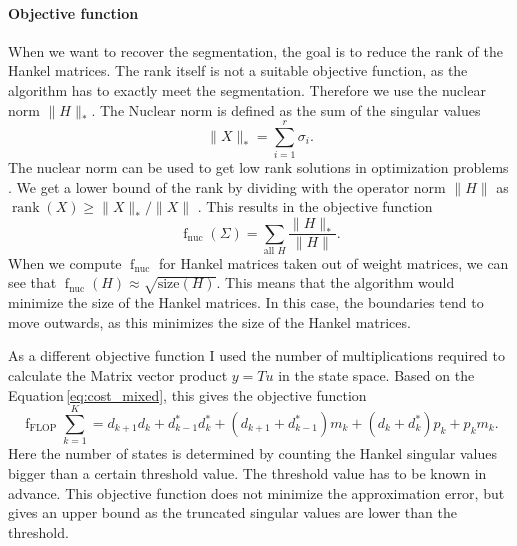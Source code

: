 \documentclass[doctype=mastersthesis,BCOR=15mm,biblatex]{ldvbook}%
\DeclareMathOperator{\rank}{rank}
\DeclareMathOperator{\f}{f}
\newcommand{\da}{d^*} %
\begin{document}
\paragraph{Objective function}
When we want to recover the segmentation, the goal is to reduce the rank of the Hankel matrices.
The rank itself is not a suitable objective function, as the algorithm has to exactly meet the segmentation.
Therefore we use the nuclear norm $\|H\|_*$.
The Nuclear norm is defined as the sum of the singular values
\begin{equation}
	\|X\|_* = \sum_{i=1}^r \sigma_i
	.
\end{equation}
The nuclear norm can be used to get low rank solutions in optimization problems \cite{liu_interior-point_2010}.
We get a lower bound of the rank by dividing with the operator norm $\|H\|$ as $\rank(X) \geq \|X\|_*/\|X\|$ \cite{recht_guaranteed_2010}.
This results in the objective function
\begin{equation}\label{eq:objective_nuc}
	\f_{\text{nuc}}(\Sigma)= \sum_{\text{all } H} \frac{\|H\|_*}{\|H\|}
	.
\end{equation}
When we compute $\f_{\text{nuc}}$ for Hankel matrices taken out of weight matrices, we can see that $\f_{\text{nuc}}(H) \approx \sqrt{\text{size}(H)}$.
This means that the algorithm would minimize the size of the Hankel matrices.
In this case, the boundaries tend to move outwards, as this minimizes the size of the Hankel matrices.


As a different objective function I used the number of multiplications required to calculate the Matrix vector product $y=Tu$ in the state space.
Based on the Equation\,\ref{eq:cost_mixed}, this gives the objective function
\begin{equation}\label{eq:objective_flop}
\f_{\text{FLOP}}\sum_{k=1}^K = d_{k+1}d_k + \da_{k-1}\da_k + (d_{k+1}+\da_{k-1})m_k +(d_k+\da_k)p_k +p_km_k 
.
\end{equation}
Here the number of states is determined by counting the Hankel singular values bigger than a certain threshold value. 
The threshold value has to be known in advance.
This objective function does not minimize the approximation error, but  gives an upper bound as the truncated singular values are lower than the threshold.
\end{document}
